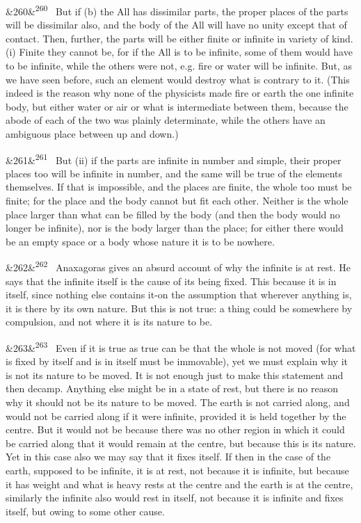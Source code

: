 \documentclass[12pt]{article}
\newcommand{\para}[1][]{\par\noindent\ifx&#1&\else\textsuperscript{\footnotesize #1}~\fi}
\begin{document}
\para[260] But if (b) the All has dissimilar parts, the proper places of the parts will be dissimilar also, and the body of the All will have no unity except that of contact. Then, further, the parts will be either finite or infinite in variety of kind. (i) Finite they cannot be, for if the All is to be infinite, some of them would have to be infinite, while the others were not, e.g. fire or water will be infinite. But, as we have seen before, such an element would destroy what is contrary to it. (This indeed is the reason why none of the physicists made fire or earth the one infinite body, but either water or air or what is intermediate between them, because the abode of each of the two was plainly determinate, while the others have an ambiguous place between up and down.)

\para[261] But (ii) if the parts are infinite in number and simple, their proper places too will be infinite in number, and the same will be true of the elements themselves. If that is impossible, and the places are finite, the whole too must be finite; for the place and the body cannot but fit each other. Neither is the whole place larger than what can be filled by the body (and then the body would no longer be infinite), nor is the body larger than the place; for either there would be an empty space or a body whose nature it is to be nowhere.

\para[262] Anaxagoras gives an absurd account of why the infinite is at rest. He says that the infinite itself is the cause of its being fixed. This because it is in itself, since nothing else contains it-on the assumption that wherever anything is, it is there by its own nature. But this is not true: a thing could be somewhere by compulsion, and not where it is its nature to be.

\para[263] Even if it is true as true can be that the whole is not moved (for what is fixed by itself and is in itself must be immovable), yet we must explain why it is not its nature to be moved. It is not enough just to make this statement and then decamp. Anything else might be in a state of rest, but there is no reason why it should not be its nature to be moved. The earth is not carried along, and would not be carried along if it were infinite, provided it is held together by the centre. But it would not be because there was no other region in which it could be carried along that it would remain at the centre, but because this is its nature. Yet in this case also we may say that it fixes itself. If then in the case of the earth, supposed to be infinite, it is at rest, not because it is infinite, but because it has weight and what is heavy rests at the centre and the earth is at the centre, similarly the infinite also would rest in itself, not because it is infinite and fixes itself, but owing to some other cause.
\end{document}

